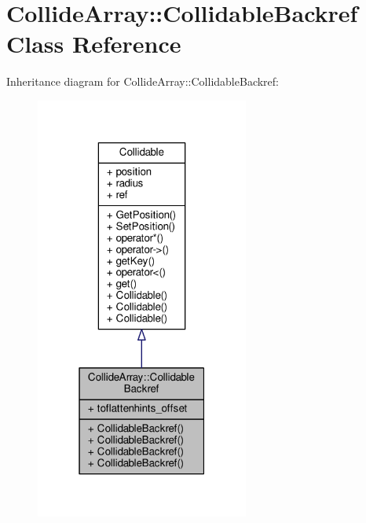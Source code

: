 \hypertarget{classCollideArray_1_1CollidableBackref}{}\section{Collide\+Array\+:\+:Collidable\+Backref Class Reference}
\label{classCollideArray_1_1CollidableBackref}


Inheritance diagram for Collide\+Array\+:\+:Collidable\+Backref\+:
\nopagebreak
\begin{figure}[H]
\begin{center}
\leavevmode
\includegraphics[width=199pt]{da/d62/classCollideArray_1_1CollidableBackref__inherit__graph}
\end{center}
\end{figure}


